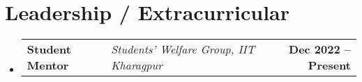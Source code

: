 \documentclass[letterpaper]{article}
\makeatletter
\newcommand{\resumeItem}[1]{
  \item\small{
    {#1 \vspace{-2pt}}
  }
}
\newcommand{\resumeLeadership}[3]{
  \vspace{-2pt}\item
    \begin{tabular*}{1.0\textwidth}[t]{l @{\hspace{0.5em}}|@{\hspace{0.5em}}l @{\extracolsep{\fill}}r}
      \textbf{#1} & \textit{\small #2} & \textbf{\small #3} \\
    \end{tabular*}\vspace{-7pt}
}
\newcommand{\resumeSubheading}[5]{
  \item
    \begin{tabular*}{1.0\textwidth}[t]{l @{\hspace{0.5em}}|@{\hspace{0.5em}} l @{\hspace{0.5em}}|@{\hspace{0.5em}} l @{\extracolsep{\fill}} r}
      \textbf{#1} & \textit{\small #2} & \textit{\small #3} & \textbf{\small #4} \\
    \end{tabular*}
  \vspace{-17pt}
  \begin{tabular*}{1.1\textwidth}[t]{l}
    \textbf{\small Objective: }\small #5
  \end{tabular*}
  \vspace{-1pt}
}
\newcommand{\resumeSubHeadingListStart}{\begin{itemize}[leftmargin=0.0in, label={}]}
\newcommand{\resumeSubHeadingListEnd}{\end{itemize}}
\newcommand{\resumeItemListStart}{\begin{itemize}[leftmargin=0.2in]}
\newcommand{\resumeItemListEnd}{\end{itemize}\vspace{-5pt}}
\makeatother
\begin{document}
\section{Leadership / Extracurricular}
  \resumeSubHeadingListStart
    
    \resumeLeadership{Student Mentor}{Students' Welfare Group, IIT Kharagpur}{Dec 2022 -- Present}
      
  \resumeSubHeadingListEnd
\end{document}
